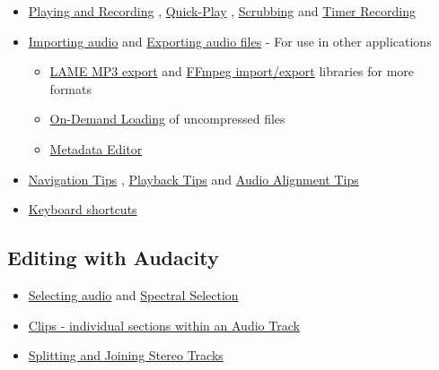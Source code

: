 \begin{multicols}{2}
\begin{itemize}
\begin{itemize}
\end{itemize}

\item 
\hyperref[\foo{manXplayingXandXrecordingX}]{Playing and Recording}
, 
\hyperref[\foo{manXtimelineXtqp}]{Quick-Play}
, 
\hyperref[\foo{manXscrubbingXandXseekingX}]{Scrubbing}
 and 
\hyperref[\foo{manXtimerXrecordX}]{Timer Recording}

\item 
\hyperref[\foo{manXimportingXaudioX}]{Importing audio}
 and 
\hyperref[\foo{manXexportingXaudioX}]{Exporting audio files}
 - For use in other applications

\begin{itemize}
\item 
\hyperref[\foo{manXfaqXinstallationXandXplugXinsXlame}]{LAME MP3 export}
 and 
\hyperref[\foo{manXfaqXinstallationXandXplugXinsXffdown}]{FFmpeg import/export}
 libraries for more formats
\item 
\hyperref[\foo{manXonXdemandXloadingX}]{On-Demand Loading}
 of uncompressed files
\item 
\hyperref[\foo{manXmetadataXeditorX}]{Metadata Editor}

\end{itemize}

\item 
\hyperref[\foo{manXnavigationXtipsX}]{Navigation Tips}
, 
\hyperref[\foo{manXplaybackXtipsX}]{Playback Tips}
 and 
\hyperref[\foo{manXaudioXalignmentXtipsX}]{Audio Alignment Tips}

\item 
\hyperref[\foo{manXkeyboardXshortcutXreferenceX}]{Keyboard shortcuts}

\end{itemize}

\subsection{Editing with Audacity}
\begin{itemize}
\item 
\hyperref[\foo{manXaudacityXselectionX}]{Selecting audio}
 and 
\hyperref[\foo{manXspectralXselectionX}]{Spectral Selection}

\item 
\hyperref[\foo{manXaudacityXtracksXandXclipsX}]{Clips - individual sections within an Audio Track}

\item 
\hyperref[\foo{manXsplittingXandXjoiningXstereoXtracksX}]{Splitting and Joining Stereo Tracks}


\end{itemize}
\end{multicols}
